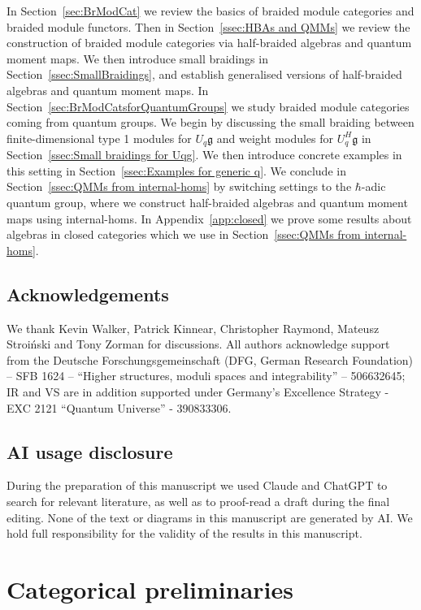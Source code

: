 \documentclass[12pt,dvipsnames]{article}
\numberwithin{equation}{section}
\theoremstyle{definition}
\newcommand{\1}{\ensuremath{\mathbbm{1}}}
\begin{document}
In Section~\ref{sec:BrModCat} we review the basics of braided module categories and braided module functors. Then in Section~\ref{ssec:HBAs and QMMs} we review the construction of braided module categories via half-braided algebras and quantum moment maps. We then introduce small braidings in Section~\ref{ssec:SmallBraidings}, and establish generalised versions of half-braided algebras and quantum moment maps. In Section~\ref{sec:BrModCatsforQuantumGroups} we study braided module categories coming from quantum groups. We begin by discussing the small braiding between finite-dimensional type 1 modules for $U_q\mathfrak{g}$ and weight modules for $U_q^H\mathfrak{g}$ in Section~\ref{ssec:Small braidings for Uqg}. We then introduce concrete examples in this setting in Section~\ref{ssec:Examples for generic q}. We conclude in Section~\ref{ssec:QMMs from internal-homs} by switching settings to the $\hbar$-adic quantum group, where we construct half-braided algebras and quantum moment maps using internal-homs. In Appendix~\ref{app:closed} we prove some results about algebras in closed categories which we use in Section~\ref{ssec:QMMs from internal-homs}.

 
\subsection*{Acknowledgements}

We thank Kevin Walker, Patrick Kinnear, Christopher Raymond, Mateusz Stroiński and Tony Zorman for discussions. All authors acknowledge support from the Deutsche Forschungsgemeinschaft (DFG, German Research Foundation) – SFB 1624 – ``Higher structures, moduli spaces and integrability'' – 506632645; IR and VS are in addition supported under Germany's Excellence Strategy - EXC 2121 ``Quantum Universe'' - 390833306.

\subsection*{AI usage disclosure}

During the preparation of this manuscript we used Claude and ChatGPT to search for relevant literature, as well as to proof-read a draft during the final editing. None of the text or diagrams in this manuscript are generated by AI. We hold full responsibility for the validity of the results in this manuscript.

\newpage

\section{Categorical preliminaries}
\end{document}

